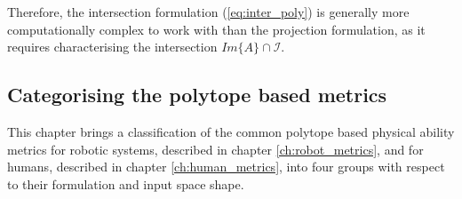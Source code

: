 Therefore, the intersection formulation (\ref{eq:inter_poly}) is generally more computationally complex to work with than the projection formulation, as it requires characterising the intersection $Im\{A\}\cap\mathcal{I}$. 




\subsection{Categorising the polytope based metrics}
\label{ch:which_metric_which}

This chapter brings a classification of the common polytope based physical ability metrics for robotic systems, described in chapter \ref{ch:robot_metrics}, and for humans, described in chapter \ref{ch:human_metrics}, into four groups with respect to their formulation and input space shape.

